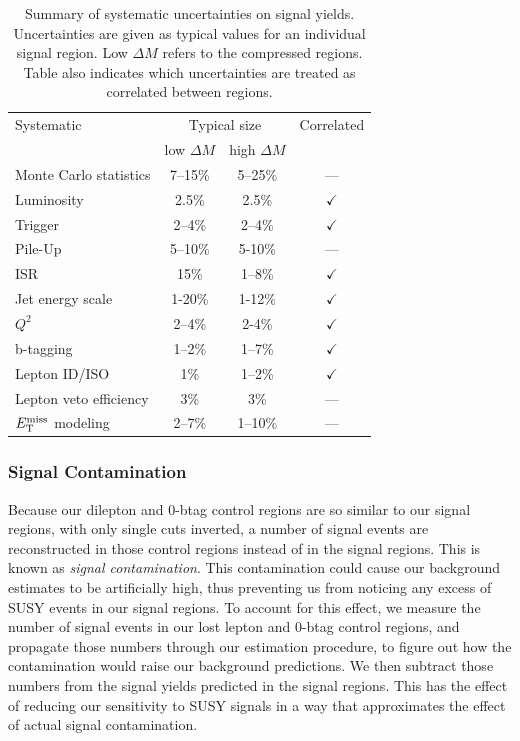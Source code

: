 \begin{table}[htbp]
\centering
\caption{Summary of systematic uncertainties on signal
  yields. Uncertainties are given as typical values for an individual
  signal region. Low $\Delta M$ refers to the compressed
  regions. Table also indicates which uncertainties are treated as
  correlated between regions.}
\label{tab:stop:signal:systematics}
\begin{tabular}{lccc}
\hline\hline
Systematic & \multicolumn{2}{c}{Typical size} & Correlated \\
 & low $\Delta M$ & high $\Delta M$ & \\
\hline
Monte Carlo statistics & 7--15\% & 5--25\% & ---  \\
Luminosity & 2.5\% & 2.5\% & $\checkmark$  \\
Trigger & 2--4\% & 2--4\% & $\checkmark$  \\
Pile-Up & 5--10\% & 5-10\% & ---  \\
ISR & 15\% & 1--8\% & $\checkmark$ \\
Jet energy scale & 1-20\% & 1-12\% & $\checkmark$ \\
$Q^2$ & 2--4\% & 2-4\% & $\checkmark$ \\
b-tagging & 1--2\% & 1--7\% & $\checkmark$ \\
Lepton ID/ISO & 1\% & 1--2\% & $\checkmark$ \\
Lepton veto efficiency & 3\% & 3\% & --- \\
$E_\text{T}^\text{miss}$ modeling & 2--7\% & 1--10\% & --- \\
\hline\hline
\end{tabular}
\end{table}

\subsubsection{Signal Contamination}
\label{sssec:stop:signal:contamination}

Because our dilepton and 0-btag control regions are so similar to our
signal regions, with only single cuts inverted, a number of signal
events are reconstructed in those control regions instead of in the
signal regions. This is known as \emph{signal contamination}. This
contamination could cause our background estimates to be
artificially high, thus preventing us from noticing any excess of SUSY
events in our signal regions. To account for this effect, we measure
the number of signal events in our lost lepton and 0-btag control
regions, and propagate those numbers through our estimation procedure,
to figure out how the contamination would raise our background
predictions. We then subtract those numbers from the signal yields
predicted in the signal regions. This has the effect of reducing our
sensitivity to SUSY signals in a way that approximates the effect of
actual signal contamination.

